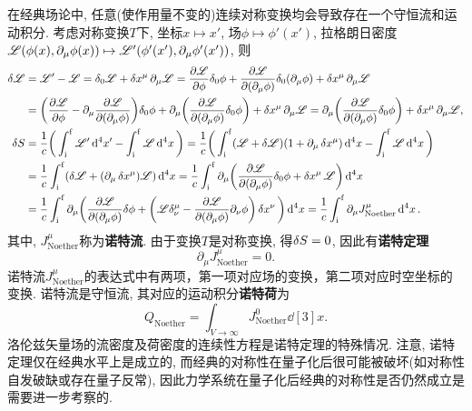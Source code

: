 在经典场论中, 任意(使作用量不变的)连续对称变换均会导致存在一个守恒流和运动积分. 考虑对称变换$ T $下, 坐标$ x \mapsto x' $, 场$ \phi \mapsto \phi'(x') $, 拉格朗日密度$ \mathscr{L}(\phi(x),\partial_{\mu}\phi(x)) \mapsto \mathscr{L}'(\phi'(x'),\partial_{\mu}\phi'(x')) $, 则
\begin{align*}
    \var{\mathscr{L}} &= \mathscr{L}'-\mathscr{L} = \var_0{\mathscr{L}} + \var{x^{\mu}} \partial_{\mu} \mathscr{L} = \pdv{\mathscr{L}}{\phi} \var_0{\phi} + \pdv{\mathscr{L}}{(\partial_{\mu} \phi)} \var_0{(\partial_{\mu}\phi)} + \var{x^{\mu}} \partial_{\mu} \mathscr{L} \\
    &= \bigg(\pdv{\mathscr{L}}{\phi} - \partial_{\mu}\pdv{\mathscr{L}}{(\partial_{\mu} \phi)}\bigg)\var_0{\phi} + \partial_{\mu} \bigg( \pdv{\mathscr{L}}{(\partial_{\mu} \phi)} \var_0{\phi} \bigg) + \var{x^{\mu}} \partial_{\mu} \mathscr{L} = \partial_{\mu} \bigg( \pdv{\mathscr{L}}{(\partial_{\mu} \phi)} \var_0{\phi} \bigg) + \var{x^{\mu}} \partial_{\mu} \mathscr{L}, \\
    \var{S} &= \frac{1}{c} \bigg(\int_{\mathrm{i}}^{\mathrm{f}} \mathscr{L}' \dd[4]{x'} - \int_{\mathrm{i}}^{\mathrm{f}} \mathscr{L} \dd[4]{x}\bigg) = \frac{1}{c} \bigg(\int_{\mathrm{i}}^{\mathrm{f}} (\mathscr{L} + \var{\mathscr{L}}) (1+\partial_{\mu}\var{x^{\mu}}) \dd[4]{x} - \int_{\mathrm{i}}^{\mathrm{f}} \mathscr{L} \dd[4]{x}\bigg)\\
    &= \frac{1}{c} \int_{\mathrm{i}}^{\mathrm{f}} (\var{\mathscr{L}} + (\partial_{\mu} \var{x^{\mu}}) \mathscr{L}) \dd[4]{x} = \frac{1}{c} \int_{\mathrm{i}}^{\mathrm{f}} \partial_{\mu} \bigg(  \pdv{\mathscr{L}}{(\partial_{\mu} \phi)} \var_0{\phi} + \var{x^{\mu}} \mathscr{L}\bigg)\dd[4]{x}\\
    &= \frac{1}{c} \int_{\mathrm{i}}^{\mathrm{f}} \partial_{\mu} \bigg( \pdv{\mathscr{L}}{(\partial_{\mu} \phi)} \var \phi + \bigg(\mathscr{L} \delta^{\mu}_{\nu} - \pdv{\mathscr{L}}{(\partial_{\mu}\phi)} \partial_{\nu} \phi \bigg) \var{x^{\nu}} \bigg)\dd[4]{x} = \frac{1}{c} \int_{\mathrm{i}}^{\mathrm{f}} \partial_{\mu} J^{\mu}_{\mathrm{Noether}} \dd[4]{x}.
\end{align*}
其中, $ J^{\mu}_{\mathrm{Noether}} $称为\textbf{诺特流}. 由于变换$ T $是对称变换, 得$ \var{S} = 0 $, 因此有\textbf{诺特定理}
\begin{equation}
    \partial_{\mu} J^{\mu}_{\mathrm{Noether}} = 0.
\end{equation}
诺特流$ J^{\mu}_{\mathrm{Noether}} $的表达式中有两项，第一项对应场的变换，第二项对应时空坐标的变换. 诺特流是守恒流, 其对应的运动积分\textbf{诺特荷}为
\begin{equation}
    Q_{\mathrm{Noether}} = \int_{V \to \infty} J^0_{\mathrm{Noether}} \dd[3]{x}.
\end{equation}
洛伦兹矢量场的流密度及荷密度的连续性方程是诺特定理的特殊情况. 注意, 诺特定理仅在经典水平上是成立的, 而经典的对称性在量子化后很可能被破坏(如对称性自发破缺或存在量子反常), 因此力学系统在量子化后经典的对称性是否仍然成立是需要进一步考察的.
\newpage
